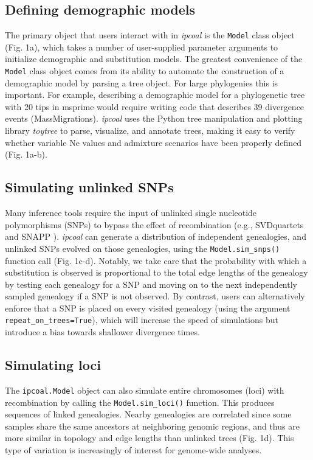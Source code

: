 \documentclass[11pt]{article}
\begin{document}
\subsection{Defining demographic models}
The primary object that users interact with in \emph{ipcoal} is the \texttt{Model} class object (Fig. 1a), which takes a number of user-supplied parameter arguments to initialize demographic and substitution models. The greatest convenience of the \texttt{Model} class object comes from its ability to automate the construction of a demographic model by parsing a tree object. For large phylogenies this is important. For example, describing a demographic model for a phylogenetic tree with 20 tips in msprime would require writing code that describes 39 divergence events (MassMigrations). \emph{ipcoal} uses the Python tree manipulation and plotting library \emph{toytree} \citep{eaton_toytree_2020} to parse, visualize, and annotate trees, making it easy to verify whether variable Ne values and admixture scenarios have been properly defined (Fig. 1a-b). 

\subsection{Simulating unlinked SNPs}
Many inference tools require the input of unlinked single nucleotide polymorphisms (SNPs) to bypass the effect of recombination (e.g., SVDquartets \citep{chifman_quartets_2014} and SNAPP \citep{bryant_snapp_2012}). \emph{ipcoal} can generate a distribution of independent genealogies, and unlinked SNPs evolved on those genealogies, using the \texttt{Model.sim\_snps()} function call (Fig. 1c-d). Notably, we take care that the probability with which a substitution is observed is proportional to the total edge lengths of the genealogy by testing each genealogy for a SNP and moving on to the next independently sampled genealogy if a SNP is not observed. By contrast, users can alternatively enforce that a SNP is placed on every visited genealogy (using the argument \texttt{repeat\_on\_trees=True}), which will increase the speed of simulations but introduce a bias towards shallower divergence times. 

\subsection{Simulating loci}
The \texttt{ipcoal.Model} object can also simulate entire chromosomes (loci) with recombination by calling the \texttt{Model.sim\_loci()} function. This produces sequences of linked genealogies. Nearby genealogies are correlated since some samples share the same ancestors at neighboring genomic regions, and thus are more similar in topology and edge lengths than unlinked trees (Fig. 1d). This type of variation is increasingly of interest for genome-wide analyses.
\end{document}
